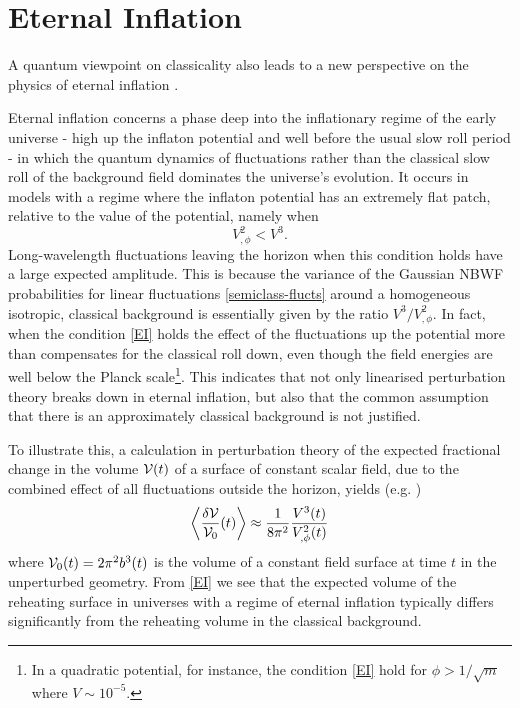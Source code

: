 \documentclass[prd,floats,superscriptaddress,eqsecnum,floatfix,nofootinbib,12pt]{revtex4}
\def\be{\begin{equation}}
\def\ee{\end{equation}}
\def\rf{}
\def\rf{}
\def\uf{}
\begin{document}
{{{{%
\section{Eternal Inflation}
\label{ei}

A quantum viewpoint on classicality also leads to a new perspective on the physics of eternal inflation \cite{EIrefs}.

Eternal inflation concerns a phase deep into the inflationary regime of the early universe - high up the inflaton potential and well before the usual slow roll period -  in which the quantum dynamics of fluctuations rather than the classical slow roll of the background field dominates the universe’s evolution. It occurs in models with a regime where the inflaton potential has an extremely flat patch, relative to the value of the potential, namely when 
\be \label{EI}
V_{,\phi}^2 < V^3.
\ee
{\rf Long-wavelength fluctuations leaving the horizon when this condition holds have a large expected amplitude. This is because the variance of the Gaussian NBWF probabilities} for linear fluctuations \eqref{semiclass-flucts} around a homogeneous isotropic, classical background is essentially given by the ratio $V^3/V_{,\phi}^2$. In fact, when the condition \eqref{EI} holds the effect of the fluctuations up the potential more than compensates for the classical roll down, even though the field energies are well below the Planck scale\footnote{In a quadratic potential, for instance, the condition \eqref{EI} hold for $\phi >1/\sqrt{m}$ where $V \sim 10^{-5}$.}. This indicates that not only linearised perturbation theory breaks down in eternal inflation, but also that the common assumption that there is an approximately classical background is not justified. 

To illustrate this, a calculation in perturbation theory of the expected fractional change in the volume ${\cal V}(t)$ of a surface of constant scalar field, due to the combined effect of all fluctuations outside the horizon, yields {\uf (e.g. \cite{HHH10a})}
\be
\left \langle \frac {\delta {\cal V}}{{\cal V}_0} (t)  \right \rangle  \approx \frac{1}{8\pi^2} \frac{V^3(t)}{V_{,\phi}^2(t)} 
\label{bent}
\ee
where ${\cal V}_0(t)=2\pi^2 b^3(t)$ is the volume of a constant field surface at time $t$ in the unperturbed geometry. 
From \eqref{EI} we see that the expected volume of the reheating surface in universes with a regime of eternal inflation typically differs significantly from the reheating volume in the classical background. 

}}}}
\end{document}
